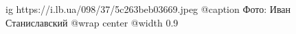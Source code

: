  
 
 
 
 

\ifcmt
  ig https://i.lb.ua/098/37/5c263beb03669.jpeg
	@caption Фото: Иван Станиславский
  @wrap center
  @width 0.9
\fi
